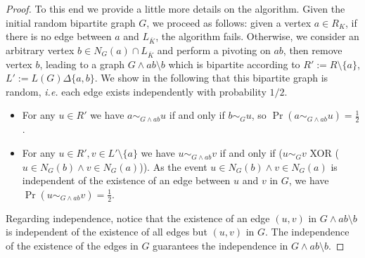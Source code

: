\documentclass[a4paper,UKenglish,cleveref, autoref, thm-restate]{arxiv}
\newcommand{\sm}{\setminus}
\begin{document}
\begin{proof}
    To this end we provide a little more details on the algorithm. Given the initial random bipartite graph $G$, we proceed as follows: given a vertex $a\in R_K$, if there is no edge between $a$ and $L_{\overline K}$, the algorithm fails. Otherwise, we consider an arbitrary vertex $b\in N_G(a)\cap L_{\overline K}$ and perform a pivoting on $ab$, then remove vertex $b$, leading to a graph $G\wedge ab\setminus b$ which is bipartite according to $R':=R\setminus \{a\}$, $L':=L(G)\Delta\{a,b\}$. We show in the following that this bipartite graph is random, \emph{i.e.} each edge exists independently with probability $1/2$.    
    \begin{itemize}
        \item For any $u\in R'$ we have $a\sim_{G\wedge ab} u$ if and only if $b\sim_{G} u$, so $\Pr(a\sim_{G\wedge ab} u)=\frac12$.
        \item For any $u\in R', v\in L'\setminus \{a\}$ we have $u\sim_{G\wedge ab} v$  if and only if  ($u\sim_{G} v$ XOR ($u\in N_G(b)\wedge v\in N_G(a)$)). As the event $u\in N_G(b)\wedge v\in N_G(a)$ is independent of the existence of an edge between $u$ and $v$ in $G$, we have $\Pr(u\sim_{G\wedge ab} v)=\frac12$.
    \end{itemize}
    Regarding independence, notice that the existence of an edge $(u,v)$ in $G\wedge ab\sm b$ is independent of the existence of all edges but $(u,v)$ in $G$. The independence of the existence of the edges in $G$ guarantees the independence in $G\wedge ab \sm b$.


\end{proof}
\end{document}
